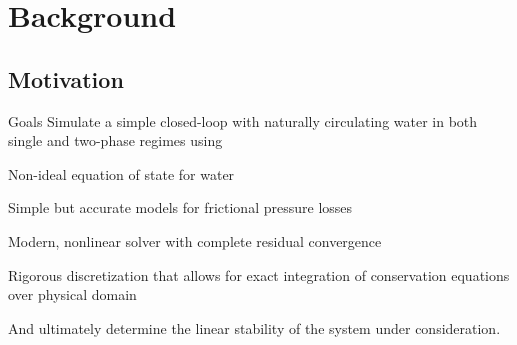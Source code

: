 \section{Background}

    \subsection*{Motivation}
    \begin{frame}{Goals}
        Simulate a simple closed-loop with naturally circulating water in both single and two-phase regimes using
        \begin{Itemize}
            \item{Non-ideal equation of state for water}
            \item{Simple but accurate models for frictional pressure losses}
            \item{Modern, nonlinear solver with complete residual convergence}
            \item{Rigorous discretization that allows for exact integration of conservation equations over physical domain}
        \end{Itemize}
        
        And ultimately determine the linear stability of the system under consideration.
    \end{frame}
    
